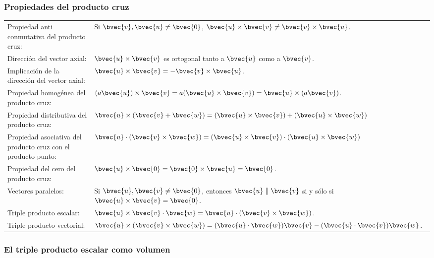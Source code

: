 \documentclass{fmbnotes}
\begin{document}
\subsubsection{Propiedades del producto cruz}

\begin{tabular}{lp{}}
	\rule[1ex]{0pt}{2.5ex} Propiedad anti conmutativa del producto cruz: & Si \(\bvec{v},\bvec{u} \neq \bvec{0}\), \( \bvec{u} \times \bvec{v} \neq \bvec{v} \times \bvec{u} \).\\
	\rule[1ex]{0pt}{2.5ex} Dirección del vector axial: & \(\bvec{u} \times \bvec{v}\) es ortogonal tanto a \(\bvec{u}\) como a \(\bvec{v}\).\\
	\rule[1ex]{0pt}{2.5ex} Implicación de la dirección del vector axial: & \(\bvec{u} \times \bvec{v}=-\bvec{v} \times \bvec{u} \).\\
	\rule[1ex]{0pt}{2.5ex} Propiedad homogénea del producto cruz: & \( (a \bvec{u}) \times \bvec{v}=a(\bvec{u} \times \bvec{v})=\bvec{u} \times (a\bvec{v}) \).\\
	\rule[1ex]{0pt}{2.5ex} Propiedad distributiva del producto cruz: & \( \bvec{u} \times(\bvec{v}+\bvec{w})=(\bvec{u} \times \bvec{v})+(\bvec{u} \times \bvec{w}) \) \\
	\rule[1ex]{0pt}{2.5ex} Propiedad asociativa del producto cruz con el producto punto: & \( \bvec{u} \cdot (\bvec{v} \times \bvec{w})=(\bvec{u} \times \bvec{v}) \cdot (\bvec{u} \times \bvec{w}) \) \\
	\rule[1ex]{0pt}{2.5ex} Propiedad del cero del producto cruz:  & \(\bvec{u} \times \bvec{0}=\bvec{0} \times \bvec{u}=\bvec{0} \). \\
	\rule[1ex]{0pt}{2.5ex} Vectores paralelos: & Si \( \bvec{u}, \bvec{v} \neq \bvec{0} \), entonces \( \bvec{u} \parallel \bvec{v} \) si y sólo si \( \bvec{u} \times \bvec{v}=\bvec{0}\).\\	
	\rule[1ex]{0pt}{2.5ex} Triple producto escalar: & \( \bvec{u} \times \bvec{v} \cdot \bvec{w}=\bvec{u} \cdot(\bvec{v} \times \bvec{w})\). \\
	\rule[1ex]{0pt}{2.5ex} Triple producto vectorial: & \( \bvec{u} \times (\bvec{v} \times \bvec{w})=(\bvec{u} \cdot \bvec{w})\bvec{v}-(\bvec{u} \cdot \bvec{v})\bvec{w}\). \\	
\end{tabular}

\subsubsection{El triple producto escalar como volumen} 
\end{document}
